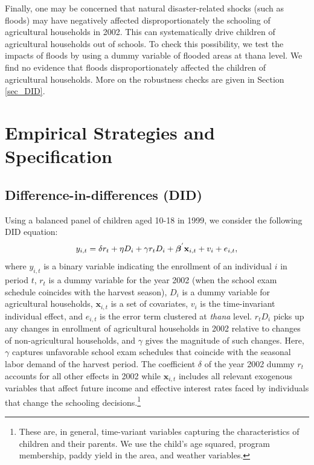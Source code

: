\documentclass[12pt,letterpaper]{article}
\newcommand{\bfbeta}{\ensuremath{\mbox{\boldmath $\beta$}}}
\newcommand{\0}{\ensuremath{\mbox{\boldmath $0$}}}
\begin{document}
Finally, one may be concerned that natural disaster-related shocks (such as floods) may have negatively affected disproportionately the schooling of agricultural households in 2002. This can systematically drive children of agricultural households out of schools. To check this possibility, we test the impacts of floods by using a dummy variable of flooded areas at thana level. We find no evidence that floods disproportionately affected the children of agricultural households. More on the robustness checks are given in Section \ref{sec_DID}. 


\section{Empirical Strategies and Specification}\label{sec_empirical}
\subsection{Difference-in-differences (DID)}

Using a balanced panel of children aged 10-18 in 1999, we consider the following DID equation:
\begin{equation}
y_{i,t} = \delta r_{t} + \eta D_{i} + \gamma r_{t}D_{i} + \bfbeta^{'} \textbf{x}_{i,t} + v_{i} + e_{i,t},
\label{estbase}
\end{equation}
where $y_{i,t}$ is a binary variable indicating the enrollment of an individual $i$ in period $t$, $r_{t}$ is a dummy variable for the year 2002 (when the school exam schedule coincides with the harvest season), $D_{i}$ is a dummy variable for agricultural households, $\textbf{x}_{i,t}$ is a set of covariates,  $v_{i}$ is the time-invariant individual effect, and $e_{i,t}$ is the error term clustered at \textit{thana} level. $r_{t}D_{i}$ picks up any changes in enrollment of agricultural households in 2002 relative to changes of non-agricultural households, and $\gamma$ gives the magnitude of such changes. Here, $\gamma$ captures unfavorable school exam schedules that coincide with the seasonal labor demand of the harvest period. The coefficient $\delta$ of the year 2002 dummy $r_{t}$ accounts for all other effects in 2002 while $\textbf{x}_{i,t}$ includes all relevant exogenous variables that affect future income and effective interest rates faced by individuals that change the schooling decisions.\footnote{These are, in general, time-variant variables capturing the characteristics of children and their parents. We use the child's age squared, program membership, paddy yield in the area, and weather variables. }
\end{document}
